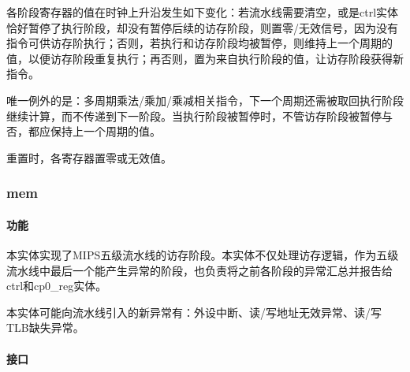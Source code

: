 \documentclass{article}
\begin{document}
\begin{spacing}{1.4}
各阶段寄存器的值在时钟上升沿发生如下变化：若流水线需要清空，或是ctrl实体恰好暂停了执行阶段，却没有暂停后续的访存阶段，则置零/无效信号，因为没有指令可供访存阶执行；否则，若执行和访存阶段均被暂停，则维持上一个周期的值，以便访存阶段重复执行；再否则，置为来自执行阶段的值，让访存阶段获得新指令。

唯一例外的是：多周期乘法/乘加/乘减相关指令，下一个周期还需被取回执行阶段继续计算，而不传递到下一阶段。当执行阶段被暂停时，不管访存阶段被暂停与否，都应保持上一个周期的值。

重置时，各寄存器置零或无效值。

\subsubsection{mem}

\paragraph{功能}\mbox{}

本实体实现了MIPS五级流水线的访存阶段。本实体不仅处理访存逻辑，作为五级流水线中最后一个能产生异常的阶段，也负责将之前各阶段的异常汇总并报告给ctrl和cp0\_reg实体。

本实体可能向流水线引入的新异常有：外设中断、读/写地址无效异常、读/写TLB缺失异常。

\paragraph{接口}\mbox{}


\end{spacing}
\end{document}

